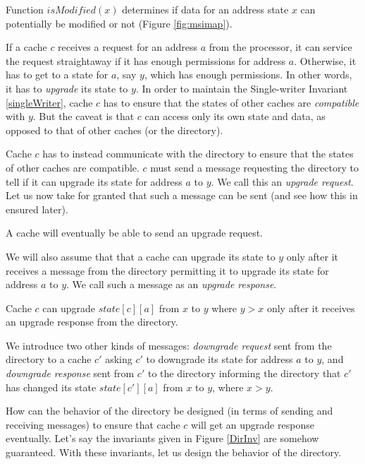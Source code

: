 Function $isModified(x)$ determines if data for an address state $x$ can
potentially be modified or not (Figure \ref{fig:msimap}).

If a cache $c$ receives a request for an address $a$ from the processor, it can
service the request straightaway if it has enough permissions for address $a$.
Otherwise, it has to get to a state for $a$, say $y$, which has enough
permissions. In other words, it has to \emph{upgrade} its state to $y$. In order
to maintain the Single-writer Invariant \ref{singleWriter}, cache $c$ has to
ensure that the states of other caches are \emph{compatible} with $y$. But the
caveat is that $c$ can access only its own state and data, as opposed to that of
other caches (or the directory).

Cache $c$ has to instead communicate with the directory to ensure that the
states of other caches are compatible. $c$ must send a message
 requesting the directory to tell if it can upgrade its state
for address $a$ to $y$. We call this an \emph{upgrade request}. Let us now take
for granted that such a message can be sent (and see how this in ensured later).

\begin{inv}
A cache will eventually be able to send an upgrade request.
\label{csendreq}
\end{inv}

We will also assume that that a cache can upgrade its state to $y$ only after it
receives a message from the directory  permitting it to
upgrade its state for address $a$ to $y$. We call such a message as an
\emph{upgrade response}.

\begin{inv}
Cache $c$ can upgrade $state[c][a]$ from $x$ to $y$ where $y > x$ only after it
receives an upgrade response  from the directory.
\label{cwaitresp}
\end{inv}

We introduce two other kinds of messages: \emph{downgrade request}
 sent from the directory to a cache $c'$ asking $c'$ to
downgrade its state for address $a$ to $y$, and \emph{downgrade response}
 sent from $c'$ to the directory informing the directory
that $c'$ has changed its state $state[c'][a]$ from $x$ to $y$, where $x > y$.

How can the behavior of the directory be designed (in terms of sending and
receiving messages) to ensure that cache $c$ will get an upgrade response
eventually. Let's say the invariants given in Figure \ref{DirInv} are
somehow guaranteed. With these invariants, let us design the behavior of the
directory.

